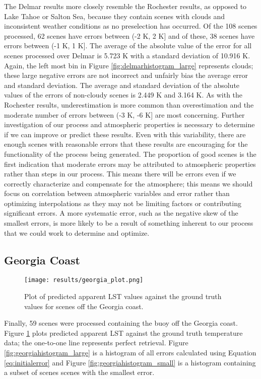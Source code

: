 \documentclass{book}
\begin{document}
The Delmar results more closely resemble the Rochester results, as opposed to Lake Tahoe or Salton Sea, because they contain scenes with clouds and inconsistent weather conditions as no preselection has occurred.  Of the 108 scenes processed, 62 scenes have errors between (-2 K, 2 K] and of these, 38 scenes have errors between (-1 K, 1 K].  The average of the absolute value of the error for all scenes processed over Delmar is 5.723 K with a standard deviation of 10.916 K.  Again, the left most bin in Figure \ref{fig:delmarhistogram_large} represents clouds; these large negative errors are not incorrect and unfairly bias the average error and standard deviation.  The average and standard deviation of the absolute values of the errors of non-cloudy scenes is 2.449 K and 3.164 K.  As with the Rochester results, underestimation is more common than overestimation and the moderate number of errors between (-3 K, -6 K] are most concerning.  Further investigation of our process and atmospheric properties is necessary to determine if we can improve or predict these results.  Even with this variability, there are enough scenes with reasonable errors that these results are encouraging for the functionality of the process being generated.  The proportion of good scenes is the first indication that moderate errors may be attributed to atmospheric properties rather than steps in our process.  This means there will be errors even if we correctly characterize and compensate for the atmosphere; this means we should focus on correlation between atmospheric variables and error rather than optimizing interpolations as they may not be limiting factors or contributing significant errors.  A more systematic error, such as the negative skew of the smallest errors, is more likely to be a result of something inherent to our process that we could work to determine and optimize.

\subsection{Georgia Coast}

\begin{figure}[H]
\centering
\texttt{[image: results/georgia\_plot.png]}
\caption{Plot of predicted apparent LST values against the ground truth values for scenes off the Georgia coast.}
\label{fig:georgia_plot}
\end{figure}


Finally, 59 scenes were processed containing the buoy off the Georgia coast.  Figure \ref{fig:georgia_plot} plots predicted apparent LST against the ground truth temperature data; the one-to-one line represents perfect retrieval.  Figure \ref{fig:georgiahistogram_large} is a histogram of all errors calculated using Equation \ref{eq:initialerror} and Figure \ref{fig:georgiahistogram_small} is a histogram containing a subset of scenes scenes with the smallest error.  
\end{document}
